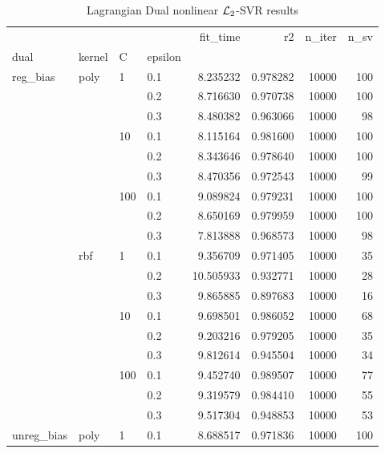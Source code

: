 \begin{table}[H]
\centering
\caption{Lagrangian Dual nonlinear $\protect \mathcal{L}_2$-SVR results}
\label{nonlinear_lagrangian_dual_l2_svr_cv_results}
\begin{tabular}{llllrrrr}
\toprule
           &     &     &     &   fit\_time &        r2 &  n\_iter &  n\_sv \\
dual & kernel & C & epsilon &            &           &         &       \\
\midrule
reg\_bias & poly & 1   & 0.1 &   8.235232 &  0.978282 &   10000 &   100 \\
           &     &     & 0.2 &   8.716630 &  0.970738 &   10000 &   100 \\
           &     &     & 0.3 &   8.480382 &  0.963066 &   10000 &    98 \\
           &     & 10  & 0.1 &   8.115164 &  0.981600 &   10000 &   100 \\
           &     &     & 0.2 &   8.343646 &  0.978640 &   10000 &   100 \\
           &     &     & 0.3 &   8.470356 &  0.972543 &   10000 &    99 \\
           &     & 100 & 0.1 &   9.089824 &  0.979231 &   10000 &   100 \\
           &     &     & 0.2 &   8.650169 &  0.979959 &   10000 &   100 \\
           &     &     & 0.3 &   7.813888 &  0.968573 &   10000 &    98 \\
           & rbf & 1   & 0.1 &   9.356709 &  0.971405 &   10000 &    35 \\
           &     &     & 0.2 &  10.505933 &  0.932771 &   10000 &    28 \\
           &     &     & 0.3 &   9.865885 &  0.897683 &   10000 &    16 \\
           &     & 10  & 0.1 &   9.698501 &  0.986052 &   10000 &    68 \\
           &     &     & 0.2 &   9.203216 &  0.979205 &   10000 &    35 \\
           &     &     & 0.3 &   9.812614 &  0.945504 &   10000 &    34 \\
           &     & 100 & 0.1 &   9.452740 &  0.989507 &   10000 &    77 \\
           &     &     & 0.2 &   9.319579 &  0.984410 &   10000 &    55 \\
           &     &     & 0.3 &   9.517304 &  0.948853 &   10000 &    53 \\
unreg\_bias & poly & 1   & 0.1 &   8.688517 &  0.971836 &   10000 &   100 \\

\end{tabular}
\end{table}
